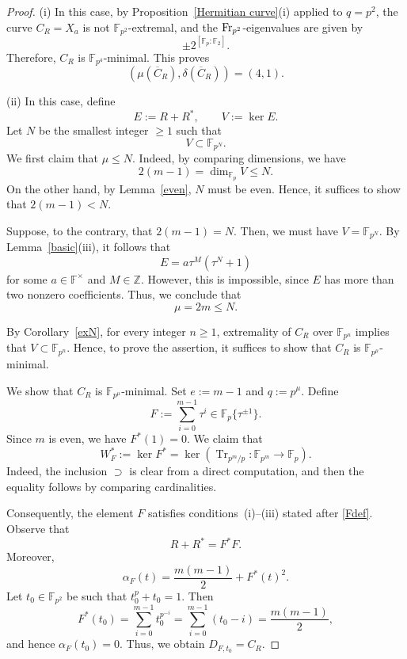 \documentclass[12pt,a4paper]{amsart}
\theoremstyle{definition}
\def\F{{\mathbb F}}
\def\Z{{\mathbb Z}}
\theoremstyle{remark}
\DeclareMathOperator{\Tr}{Tr}
\begin{document}
\begin{proof}
(i) In this case, by Proposition~\ref{Hermitian curve}(i) applied to $q=p^2$, the curve $C_R=X_a$ is not $\F_{p^2}$-extremal, and the ${\rm Fr}_{p^2}$-eigenvalues are given by 
\[
\pm 2^{[\F_{p}:\F_2]}. 
\]
Therefore, $C_R$ is $\F_{p^4}$-minimal. This proves 
\[
(\mu(\overline{C}_R),\delta(\overline{C}_R))=(4,1). 
\]

\medskip

\noindent
(ii) In this case, define 
\[
E:=R+R^\ast,\qquad V:=\ker E. 
\]
Let $N$ be the smallest integer $\geq1$ such that 
\[
V\subset \F_{p^N}. 
\]
We first claim that $\mu\leq N$. Indeed, by comparing dimensions, we have 
\[
2(m-1)=\dim_{\F_p}
V\leq N.\]
On the other hand, by Lemma~\ref{even}, $N$ must be even. Hence, it suffices to show that $2(m-1)<N$. 

Suppose, to the contrary, that $2(m-1)=N$. Then, we must have $V=\F_{p^N}$. By Lemma~\ref{basic}(iii), it follows that 
\[
E=a\tau^M(\tau^N+1)
\]
for some $a\in \F^\times$ and $M\in\Z$. However, this is impossible, since $E$ has more than two nonzero coefficients. 
Thus, we conclude that 
\[\mu=2m\leq N. \]

By Corollary~\ref{exN}, for every integer $n\geq1$, extremality of $C_R$ over $\F_{p^n}$ implies that $V\subset \F_{p^n}$. Hence, to prove the assertion, it suffices to show that $C_R$ is $\F_{p^\mu}$-minimal. 

\medskip 

We show that $C_R$ is $\F_{p^\mu}$-minimal. Set $e:=m-1$ and $q:=p^\mu$. Define 
    \[
    F:=\sum_{i=0}^{m-1}\tau^i\in\F_p\{\tau^{\pm1}\}. 
    \]
    Since $m$ is even, we have $F^\ast(1)=0$. We claim that 
    \begin{equation}\label{WF=kerTr}
        W_F^\ast:=\ker F^\ast=\ker(\Tr_{p^m/p}\colon \F_{p^m}\to \F_p).
    \end{equation}
Indeed, the inclusion $\supset$ is clear from a direct computation, and then the equality follows by comparing cardinalities. 

Consequently, the element $F$ satisfies conditions~\textup{(i)--(iii)} stated after \eqref{Fdef}. Observe that 
    \[
    R+R^\ast=F^\ast F. 
    \]
Moreover, 
\[
\alpha_F(t)=\frac{m(m-1)}{2}+F^\ast(t)^2. 
\]
    Let $t_0\in\F_{p^2}$ be such that $t_0^{p}+t_0=1$. Then 
    \[
    F^\ast(t_0)=\sum_{i=0}^{m-1}t_0^{p^{-i}}=\sum_{i=0}^{m-1}(t_0-i)=\frac{m(m-1)}{2}, 
    \]
    and hence $\alpha_F(t_0)=0$. Thus, we obtain $D_{F,t_0}=C_R$. 


\end{proof}
\end{document}
